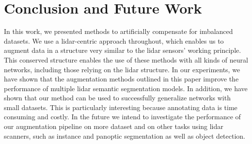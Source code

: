 \documentclass[letterpaper, 10 pt, conference]{ieeeconf}
\begin{document}
\section{Conclusion and Future Work}
In this work, we presented methods to artificially compensate for imbalanced datasets. We use a lidar-centric approach throughout, which enables us to augment data in a structure very similar to the lidar sensors' working principle. This conserved structure enables the use of these methods with all kinds of neural networks, including those relying on the lidar structure.
In our experiments, we have shown that the augmentation methods outlined in this paper improve the performance of multiple lidar semantic segmentation models.
In addition, we have shown that our method can be used to successfully generalize networks with small datasets. This is particularly interesting because annotating data is time consuming and costly.
In the future we intend to investigate the performance of our augmentation pipeline on more dataset and on other tasks using lidar scanners, such as instance and panoptic segmentation as well as object detection.








{\small
	
	
}
\end{document}
